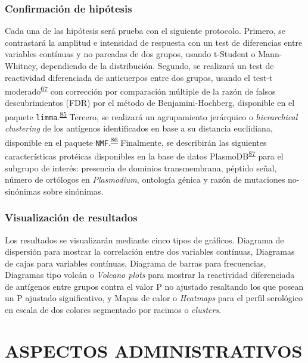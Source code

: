 \documentclass[]{article}
\begin{document}
\subsubsection{Confirmación de
hipótesis}\label{confirmacion-de-hipotesis}

Cada una de las hipótesis será prueba con el siguiente protocolo.
Primero, se contrastará la amplitud e intensidad de respuesta con un
test de diferencias entre variables contínuas y no pareadas de dos
grupos, usando t-Student o Mann-Whitney, dependiendo de la distribución.
Segundo, se realizará un test de reactividad diferenciada de anticuerpos
entre dos grupos, usando el test-t
moderado\textsuperscript{\protect\hyperlink{ref-smyth2004ebayes}{67}}
con corrección por comparación múltiple de la razón de falsos
descubrimientos (FDR) por el método de Benjamini-Hochberg, disponible en
el paquete
\texttt{limma}.\textsuperscript{\protect\hyperlink{ref-limma}{85}}
Tercero, se realizará un agrupamiento jerárquico o \emph{hierarchical
clustering} de los antígenos identificados en base a su distancia
euclidiana, disponible en el paquete
\texttt{NMF}.\textsuperscript{\protect\hyperlink{ref-Gaujoux2010NMF}{86}}
Finalmente, se describirán las siguientes características protéicas
disponibles en la base de datos
PlasmoDB\textsuperscript{\protect\hyperlink{ref-plasmodb}{87}} para el
subgrupo de interés: presencia de dominios transmembrana, péptido señal,
número de ortólogos en \emph{Plasmodium}, ontología génica y razón de
mutaciones no-sinónimas sobre sinónimas.

\subsubsection{Visualización de
resultados}\label{visualizacion-de-resultados}

Los resultados se visualizarán mediante cinco tipos de gráficos.
Diagrama de dispersión para mostrar la correlación entre dos variables
contínuas, Diagramas de cajas para variables contínuas, Diagrama de
barras para frecuencias, Diagramas tipo volcán o \emph{Volcano plots}
para mostrar la reactividad diferenciada de antígenos entre grupos
contra el valor P no ajustado resaltando los que posean un P ajustado
significativo, y Mapas de calor o \emph{Heatmaps} para el perfil
serológico en escala de dos colores segmentado por racimos o
\emph{clusters}.

\section{ASPECTOS ADMINISTRATIVOS}\label{aspectos-administrativos}
\end{document}
